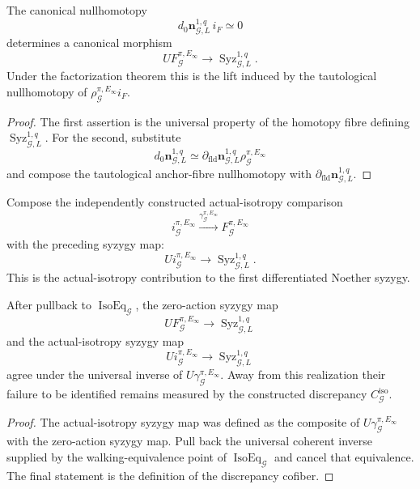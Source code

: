 \begin{theorem}
\label{thm:symmetry-noether-anchor-fibre-syzygy-map}
The canonical nullhomotopy
\[
d_0\mathbf n_{\mathcal G,L}^{1,q}\,i_F\simeq0
\]
determines a canonical morphism
\[
\boxed{
UF_{\mathcal G}^{\pi,E_\infty}
\longrightarrow
\operatorname{Syz}_{\mathcal G,L}^{1,q}.
}
\]
Under the factorization theorem this is the lift induced by the tautological
nullhomotopy of
$\rho_{\mathcal G}^{\pi,E_\infty}i_F$.
\end{theorem}

\begin{proof}
The first assertion is the universal property of the homotopy fibre defining
$\operatorname{Syz}_{\mathcal G,L}^{1,q}$.  For the second, substitute
\[
d_0\mathbf n_{\mathcal G,L}^{1,q}
\simeq
\partial_{\mathrm{fld}}\mathbf n_{\mathcal G,L}^{1,q}
\rho_{\mathcal G}^{\pi,E_\infty}
\]
and compose the tautological anchor-fibre nullhomotopy with
$\partial_{\mathrm{fld}}\mathbf n_{\mathcal G,L}^{1,q}$.
\end{proof}

\begin{construction}
\label{constr:symmetry-noether-actual-isotropy-to-noether-comparison}
Compose the independently constructed actual-isotropy comparison
\[
i_{\mathcal G}^{\pi,E_\infty}
\xrightarrow{\gamma_{\mathcal G}^{\pi,E_\infty}}
F_{\mathcal G}^{\pi,E_\infty}
\]
with the preceding syzygy map:
\[
\boxed{
Ui_{\mathcal G}^{\pi,E_\infty}
\longrightarrow
\operatorname{Syz}_{\mathcal G,L}^{1,q}.
}
\]
This is the actual-isotropy contribution to the first differentiated Noether
syzygy.
\end{construction}

\begin{proposition}
\label{prop:symmetry-noether-isotropy-exact-noether-syzygy-comparison}
After pullback to $\operatorname{IsoEq}_{\mathcal G}$, the zero-action syzygy map
\[
UF_{\mathcal G}^{\pi,E_\infty}
\longrightarrow
\operatorname{Syz}_{\mathcal G,L}^{1,q}
\]
and the actual-isotropy syzygy map
\[
Ui_{\mathcal G}^{\pi,E_\infty}
\longrightarrow
\operatorname{Syz}_{\mathcal G,L}^{1,q}
\]
agree under the universal inverse of
$U\gamma_{\mathcal G}^{\pi,E_\infty}$.  Away from this realization their failure
to be identified remains measured by the constructed discrepancy
$C_{\mathcal G}^{\mathrm{iso}}$.
\end{proposition}

\begin{proof}
The actual-isotropy syzygy map was defined as the composite of
$U\gamma_{\mathcal G}^{\pi,E_\infty}$ with the zero-action syzygy map.  Pull back
the universal coherent inverse supplied by the walking-equivalence point of
$\operatorname{IsoEq}_{\mathcal G}$ and cancel
that equivalence.  The final statement is the definition of the discrepancy
cofiber.
\end{proof}


